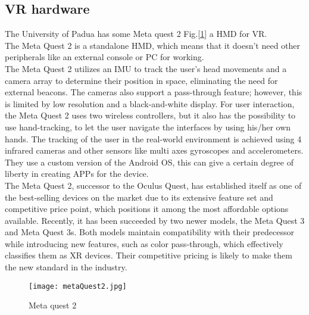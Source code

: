 \subsection{VR hardware}
\noindent
The University of Padua has some Meta quest 2 Fig.[\ref{fig:metaQuest2}] a \ac{HMD} for \ac{VR}.\\ 
The Meta Quest 2 is a standalone \ac{HMD}, which means that it doesn't need other peripherals like an external console or \ac{PC} for working.\\
The Meta Quest 2 utilizes an \ac{IMU} to track the user's head movements and a camera array to determine their position in space, eliminating the need for external beacons.
The cameras also support a pass-through feature; however, this is limited by low resolution and a black-and-white display.
For user interaction, the Meta Quest 2 uses two wireless controllers, but it also has the possibility to use hand-tracking, to let the user navigate the interfaces by using his/her own hands.
The tracking of the user in the real-world environment is achieved using 4 infrared cameras and other sensors like multi axes gyroscopes and accelerometers.\\
They use a custom version of the Android \ac{OS}, this can give a certain degree of liberty in creating APPs for the device.\\
The Meta Quest 2, successor to the Oculus Quest, has established itself as one of the best-selling devices on the market due to its extensive feature set and competitive price point, which positions it among the most affordable options available.
Recently, it has been succeeded by two newer models, the Meta Quest 3 and Meta Quest 3s.
Both models maintain compatibility with their predecessor while introducing new features, such as color pass-through, which effectively classifies them as \ac{XR} devices.
Their competitive pricing is likely to make them the new standard in the industry.


\begin{figure}[ht]
  \centering
  \texttt{[image: metaQuest2.jpg]}
  \caption{Meta quest 2}
  \label{fig:metaQuest2}
\end{figure}


